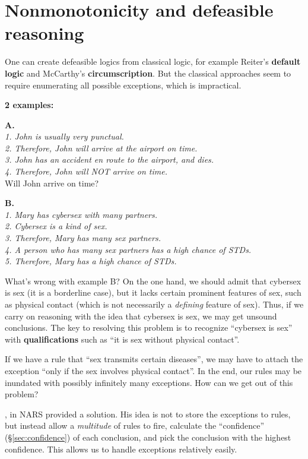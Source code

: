 \section{Nonmonotonicity and defeasible reasoning}
\label{sec:exceptions}

One can create defeasible logics from classical logic, for example Reiter's \textbf{default logic} and McCarthy's \textbf{circumscription}.  But the classical approaches seem to require enumerating all possible exceptions, which is impractical.

\textbf{2 examples:}

\textbf{A.}\\
\textit{
1. John is usually very punctual.\\
2. Therefore, John will arrive at the airport on time.\\
3. John has an accident en route to the airport, and dies.\\
4. Therefore, John will NOT arrive on time.\\}
Will John arrive on time?

\textbf{B.}\\
\textit{
1. Mary has cybersex with many partners.\\
2. Cybersex is a kind of sex.\\
3. Therefore, Mary has many sex partners.\\
4. A person who has many sex partners has a high chance of STDs.\\
5. Therefore, Mary has a high chance of STDs.}

What's wrong with example B?  On the one hand, we should admit that cybersex is sex (it is a borderline case), but it lacks certain prominent features of sex, such as physical contact (which is not necessarily a \textit{defining} feature of sex).  Thus, if we carry on reasoning with the idea that cybersex is sex, we may get unsound conclusions.  The key to resolving this problem is to recognize ``cybersex is sex'' with \textbf{qualifications} such as ``it is sex without physical contact''.

If we have a rule that ``sex transmits certain diseases'', we may have to attach the exception ``only if the sex involves physical contact''.  In the end, our rules may be inundated with possibly infinitely many exceptions.  How can we get out of this problem?

\citep*{Wang1994}, \citep*{Wang2006} in NARS provided a solution.  His idea is not to store the exceptions to rules, but instead allow a \textit{multitude} of rules to fire, calculate the ``confidence'' (\S\ref{sec:confidence}) of each conclusion, and pick the conclusion with the highest confidence.  This allows us to handle exceptions relatively easily.

